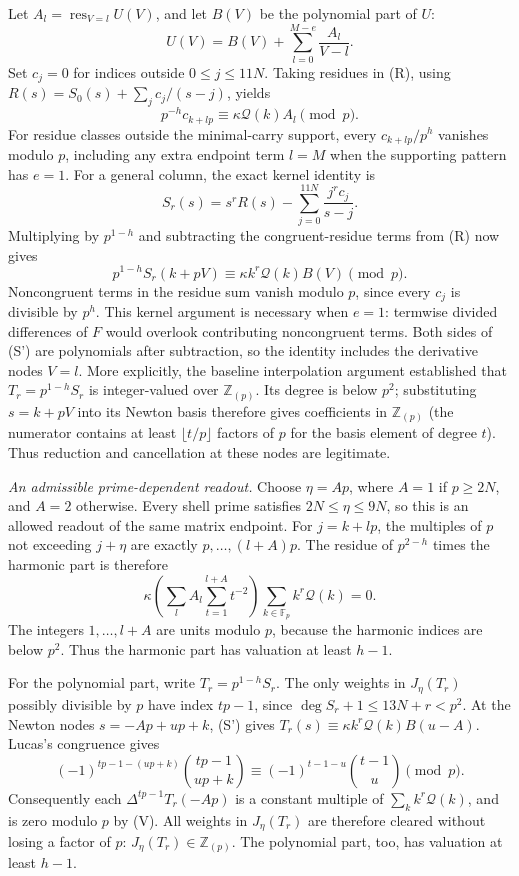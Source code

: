 \documentclass[11pt]{article}
\begin{document}
Let $A_l=\operatorname{res}_{V=l}U(V)$, and let $B(V)$ be the polynomial
part of $U$:
\[
 U(V)=B(V)+\sum_{l=0}^{M-e}\frac{A_l}{V-l}.
\]
Set $c_j=0$ for indices outside $0\le j\le11N$. Taking residues in (R), using
$R(s)=S_0(s)+\sum_j c_j/(s-j)$, yields
\[
 p^{-h}c_{k+lp}\equiv\kappa \mathcal Q(k)A_l\pmod p.
 \tag{C'}
\]
For residue classes outside the minimal-carry support, every
$c_{k+lp}/p^h$ vanishes modulo $p$, including any extra endpoint term
$l=M$ when the supporting pattern has $e=1$.
For a general column, the exact kernel identity is
\[
 S_r(s)=s^rR(s)-\sum_{j=0}^{11N}\frac{j^rc_j}{s-j}.
\]
Multiplying by $p^{1-h}$ and subtracting the congruent-residue terms
from (R) now gives
\[
 p^{1-h}S_r(k+pV)
      \equiv\kappa k^r\mathcal Q(k)B(V)\pmod p.
 \tag{S'}
\]
Noncongruent terms in the residue sum vanish modulo $p$, since every
$c_j$ is divisible by $p^h$. This kernel argument is necessary when
$e=1$: termwise divided differences of $F$ would overlook contributing
noncongruent terms. Both sides of (S') are polynomials after subtraction,
so the identity includes the derivative nodes $V=l$.
More explicitly, the baseline interpolation argument established that
$T_r=p^{1-h}S_r$ is integer-valued over $\mathbb Z_{(p)}$.
Its degree is below $p^2$; substituting $s=k+pV$ into its Newton basis
therefore gives coefficients in $\mathbb Z_{(p)}$ (the numerator contains
at least $\lfloor t/p\rfloor$ factors of $p$ for the basis element of
degree $t$). Thus reduction and cancellation at these nodes are legitimate.

\emph{An admissible prime-dependent readout.}
Choose $\eta=Ap$, where $A=1$ if $p\ge2N$, and $A=2$ otherwise.
Every shell prime satisfies $2N\le\eta\le9N$, so this is an allowed
readout of the same matrix endpoint. For $j=k+lp$, the multiples of
$p$ not exceeding $j+\eta$ are exactly $p,\ldots,(l+A)p$.
The residue of $p^{2-h}$ times the harmonic part is therefore
\[
 \kappa\left(\sum_l A_l\sum_{t=1}^{l+A}t^{-2}\right)
           \sum_{k\in\mathbb F_p}k^r\mathcal Q(k)=0.
\]
The integers $1,\ldots,l+A$ are units modulo $p$, because the
harmonic indices are below $p^2$. Thus the harmonic part has valuation
at least $h-1$.

For the polynomial part, write $T_r=p^{1-h}S_r$.
The only weights in $J_\eta(T_r)$ possibly divisible by $p$ have index
$tp-1$, since $\deg S_r+1\le13N+r<p^2$.
At the Newton nodes $s=-Ap+up+k$, (S') gives
$T_r(s)\equiv\kappa k^r\mathcal Q(k)B(u-A)$.
Lucas's congruence gives
\[
 (-1)^{tp-1-(up+k)}\binom{tp-1}{up+k}
       \equiv(-1)^{t-1-u}\binom{t-1}{u}\pmod p.
\]
Consequently each $\Delta^{tp-1}T_r(-Ap)$ is a constant multiple of
$\sum_k k^r\mathcal Q(k)$, and is zero modulo $p$ by (V).
All weights in $J_\eta(T_r)$ are therefore cleared without losing a
factor of $p$: $J_\eta(T_r)\in\mathbb Z_{(p)}$.
The polynomial part, too, has valuation at least $h-1$.
\end{document}
